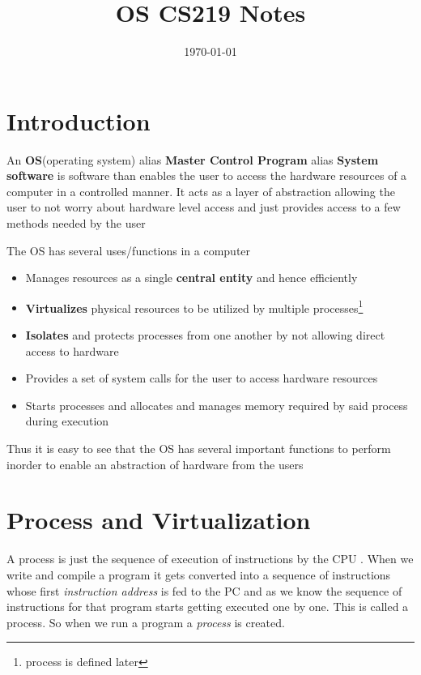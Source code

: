 \documentclass[12pt]{article}
\title{OS CS219 Notes}
\author{}
\date{\today}
\newcommand{\tbox}[1]{\noindent\fbox{\parbox{\textwidth}{#1}}}
\begin{document}
\maketitle
\setlength{\parskip}{6pt}
\setlength{\parindent}{0pt}

\noindent\tbox{
    \begin{center}
    \textbf{\Huge Lecture 1}
    \end{center}
}
\section{Introduction}
\noindent An \textbf{OS}(operating system) alias \textbf{Master Control Program} alias \textbf{System software} is software than enables the user to access the hardware resources of a computer 
in a controlled manner. It acts as a layer of abstraction allowing the user to not worry
about hardware level access and just provides access to a few methods needed by the user


\noindent The OS has several uses/functions in a computer
\begin{itemize}[topsep=0pt, partopsep=0pt, itemsep=0pt, parsep=0pt]
    \item Manages resources as a single \textbf{central entity} and hence efficiently
    \item \textbf{Virtualizes} physical resources to be utilized by multiple processes\footnote{process is defined later}
    \item \textbf{Isolates} and protects processes from one another by not allowing direct access to hardware 
    \item Provides a set of system calls for the user to access hardware resources
    \item Starts processes and allocates and manages memory required by said process during execution
\end{itemize}

\noindent Thus it is easy to see that the OS has several important functions to perform inorder to enable an abstraction of hardware from the users

\section{Process and Virtualization}

\noindent A process is just the sequence of execution of instructions by the CPU
. When we write and compile a program it gets converted into a sequence of instructions whose first \textit{instruction address} is fed to the PC and as we know 
the sequence of instructions for that program starts getting executed one by one. This is called a process. So when we run a program a \textit{process} is created.
\end{document}
